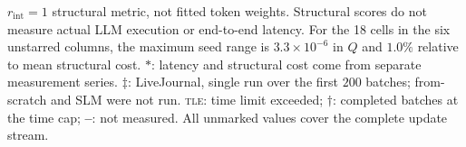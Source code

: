 \begin{table}[t]
\begin{minipage}{\textwidth}
$r_{\mathrm{int}}=1$ structural metric, not fitted token weights. Structural
scores do not measure actual LLM execution or end-to-end latency. For the 18 \DyLo{} cells in the six unstarred
columns, the maximum seed range is
$3.3\times10^{-6}$ in $Q$ and $1.0\%$ relative to mean structural cost.
$*$: latency and structural cost come from separate measurement series.
$\ddagger$: LiveJournal, single run over the first $200$ batches; from-scratch \Louvain{} and SLM were not run. \textsc{tle}: time limit exceeded; $\dagger$: completed batches at
the time cap; \textbf{--}: not measured. All unmarked values cover the complete
update stream.
\end{minipage}
\end{table}
